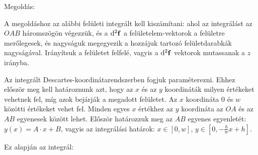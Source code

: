 
\ifdefined\megoldas
 
 
 Megoldás: 

 A megoldáshoz az alábbi felületi integrált kell kiszámítani:
 ahol az integrálást az $OAB$ háromszögön végezzük, és a $\mathrm{d}^2\mathbf{f}$ a felületelem-vektorok a felületre merőlegesek, és nagyságuk megegyezik a hozzájuk tartozó felületdarabkák nagyságával. Irányítsuk a felületet felfelé, vagyis a $\mathrm{d}^2\mathbf{f}$ vektorok mutassanak a $z$ irányba. 

 Az integrált Descartes-koordinátarendszerben fogjuk paraméterezni. Ehhez először meg kell határoznunk azt, hogy az $x$ és az $y$ koordináták milyen értékeket vehetnek fel, míg azok bejárják a megadott felületet. Az $x$ koordináta $0$ és $w$ közötti értékeket vehet fel. Minden egyes $x$ értékhez az $y$ koordináta az $OA$ és az $AB$ egyenesek között lehet. Először határozzuk meg az $AB$ egyenes egyenletét: $y(x)=A\cdot x + B$,
 vagyis az integrálási határok: $x\in [0,w]$, $y\in\left[0,-\frac{h}{w}x+h\right]$.

 Ez alapján az integrál:
 
\fi